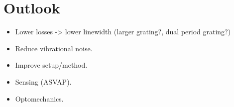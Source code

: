 \section{Outlook}

\begin{itemize}
    \item Lower losses -> lower linewidth (larger grating?, dual period grating?)
    \item Reduce vibrational noise. 
    \item Improve setup/method.
    \item Sensing (ASVAP).
    \item Optomechanics.
\end{itemize}